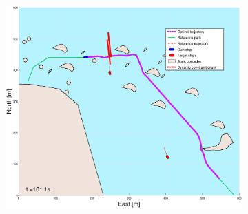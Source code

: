 \begin{figure}[!ht]
\begin{subfigure}[b]{0.494\textwidth}
        \includegraphics[width=\textwidth]{Images/Figures/skjergard_m_trafikk_NEW/_Simple_1fig999_time=101}
        \subcaption{}
    \end{subfigure}
    \hfill
\end{figure}%
